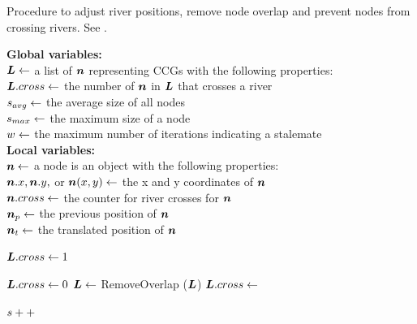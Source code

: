 \begin{algorithm}[tb!]
    \caption{Procedure to adjust river positions, remove node overlap and prevent nodes from crossing rivers. See .}\label{alg:UpdateLayout}
    \textbf{Global variables:} \\
    $ \bm{L} \gets $ a list of $ \bm{n} $ representing CCGs with the following properties: \\
    \-\hspace{1em}  $\bm{L}.cross \gets $ the number of $ \bm{n} $ in $ \bm{L} $ that crosses a river \\
    $ s_{avg} \gets $ the average size of all nodes \\
    $ s_{max} \gets $ the maximum size of a node \\
    $ w \gets $ the maximum number of iterations indicating a stalemate \\

    \textbf{Local variables:} \\
    $ \bm{n} \gets $ a node is an object with the following properties: \\
    \-\hspace{1em} $ \bm{n}.x, \bm{n}.y, $ or $ \bm{n}(x,y) \gets $ the x and y coordinates of $ \bm{n} $ \\
    \-\hspace{1em} $ \bm{n}.cross \gets $ the counter for river crosses for $ \bm{n} $ \\
    \-\hspace{1em} $ \bm{n}_{p} \gets $ the previous position of $ \bm{n} $ \\
    \-\hspace{1em} $ \bm{n}_t \gets $ the translated position of $ \bm{n} $ \\

    \begin{algorithmic}[1]
        \While{$ \nodeSizeAvg < \nodeSizeMax $}
        \State $ \bm{L}.cross \gets 1 $ 

        \State $ \bm{L}.cross \gets 0 $
        \State $ \bm{L} \gets $ RemoveOverlap ($ \bm{L} $)
        \State {}
        \State $\bm{L}.cross \gets $ 

        \EndWhile

        \State $ s ++ $

        \EndWhile

        \EndProcedure
    \end{algorithmic}
\end{algorithm}


